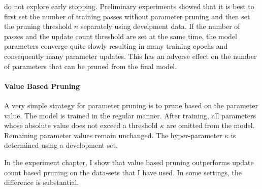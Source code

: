 \citep{Goldberg2011} do not explore early stopping. Preliminary
experiments showed that it is best to first set the number of training
passes without parameter pruning and then set the pruning threshold
$n$ separately using develpment data. If the number of passes and the
update count threshold are set at the same time, the model parameters
converge quite slowly resulting in many training epochs and
consequently many parameter updates. This has an adverse effect on the
number of parameters that can be pruned from the final model.

\paragraph{Value Based Pruning} A very simple strategy for
parameter pruning is to prune based on the parameter value. The model
is trained in the regular manner. After training, all parameters whose
absolute value does not exceed a threshold $\kappa$ are omitted from
the model. Remaining parameter values remain unchanged. The
hyper-parameter $\kappa$ is determined using a development set.

In the experiment chapter, I show that value based pruning outperforms
update count based pruning on the data-sets that I have used. In some
settings, the difference is substantial.
